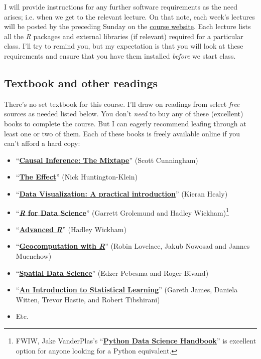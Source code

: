 \documentclass[11pt]{article}
\begin{document}
I will provide instructions for any further software requirements as the need arises; i.e. when we get to the relevant lecture. On that note, each week's lectures will be posted by the preceding Sunday on the \href{https://github.com/ECON368-fall2023-big-data-and-economics}{course website}. Each lecture lists all the \textit{R} packages and external libraries (if relevant) required for a particular class. I'll try to remind you, but my expectation is that you will look at these requirements and ensure that you have them installed \textit{before} we start class. 

\subsection*{Textbook and other readings}

There's no set textbook for this course. I'll draw on readings from select \textit{free} sources as needed listed below. You don't \textit{need} to buy any of these (excellent) books to complete the course. But I can eagerly recommend leafing through at least one or two of them. Each of these books is freely available online if you can't afford a hard copy:
%
\begin{itemize}
  \item ``\href{https://mixtape.scunning.com/}{\textbf{Causal Inference: The Mixtape}}'' (Scott Cunningham)
  \item  ``\href{https://theeffectbook.net/}{\textbf{The Effect}}'' (Nick Huntington-Klein)
  \item ``\href{http://socviz.co/}{\textbf{Data Visualization: A practical introduction}}'' (Kieran Healy)
	\item ``\href{https://r4ds.hadley.nz/}{\textbf{\textit{R} for Data Science}}'' (Garrett Grolemund and Hadley Wickham)\footnote{FWIW, Jake VanderPlas's ``\href{https://jakevdp.github.io/PythonDataScienceHandbook/}{\textbf{Python Data Science Handbook}}'' is excellent option for anyone looking for a Python equivalent.}
   \item ``\href{https://adv-r.hadley.nz/}{\textbf{Advanced \textit{R}}}'' (Hadley Wickham)
   \item ``\href{https://geocompr.robinlovelace.net/}{\textbf{Geocomputation with \textit{R}}}'' (Robin Lovelace, Jakub Nowosad and Jannes Muenchow)
   \item ``\href{https://keen-swartz-3146c4.netlify.app/}{\textbf{Spatial Data Science}}'' (Edzer Pebesma and Roger Bivand)
   \item ``\href{https://statlearning.com}{\textbf{An Introduction to Statistical Learning}}'' (Gareth James, Daniela Witten, Trevor Hastie, and Robert Tibshirani)
   \item Etc.
\end{itemize}
\end{document}
